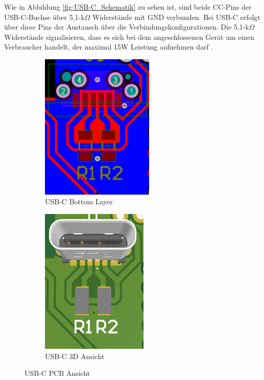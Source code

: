 \begin{inhalt}
Wie in Abbildung \ref{fig:USB-C_Schematik} zu sehen ist, sind beide CC-Pins der USB-C-Buchse über 5,1-k$\Omega$ Widerstände mit GND verbunden. Bei USB-C erfolgt über diese Pins der Austausch über die Verbindungskonfigurationen. Die 5,1-k$\Omega$ Widerstände signalisieren, dass es sich bei dem angeschlossenen Gerät um einen Verbraucher handelt, der maximal 15W Leistung aufnehmen darf \cite{USBC_Kommunikation}.

\begin{figure}[H] 
  \centering

  \begin{subfigure}[b]{0.48\textwidth}
    \centering
    \includegraphics[height=7cm]{files/Tobias/pics/Schaltungen/PCB/USB_C_PCB.PNG}
    \caption{USB-C Bottom Layer}
    \label{fig:USB-C_Bottom_layer}
  \end{subfigure}
  \hfill
  \begin{subfigure}[b]{0.48\textwidth}
    \centering
    \includegraphics[height=7cm]{files/Tobias/pics/Schaltungen/PCB/USB_C_PCB_3D.PNG}
    \caption{USB-C 3D Ansicht}
    \label{fig:USB-C_3D_Ansicht}
  \end{subfigure}

  \caption{USB-C PCB Ansicht}
  \label{fig:pcb_layers}
\end{figure}




\end{inhalt}
